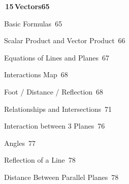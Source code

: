 \documentclass[a4paper,openany]{book}
\begin{document}
{\medskip\noindent\colorbox{blue!8}{\parbox{\dimexpr\textwidth-2\fboxsep}{\large\bfseries\color{blue!50!black}\colorbox{blue!50!black}{\color{white}\,15\,}\quad Vectors\hfill 65}}\par\nopagebreak\smallskip\nopagebreak
\noindent{}\quad Basic Formulas\dotfill\ 65\par
\noindent{}\quad Scalar Product and Vector Product\dotfill\ 66\par
\noindent{}\quad Equations of Lines and Planes\dotfill\ 67\par
\noindent{}\quad Interactions Map\dotfill\ 68\par
\noindent{}\quad Foot / Distance / Reflection\dotfill\ 68\par
\noindent{}\quad Relationships and Intersections\dotfill\ 71\par
\noindent{}\quad Interaction between 3 Planes\dotfill\ 76\par
\noindent{}\quad Angles\dotfill\ 77\par
\noindent{}\quad Reflection of a Line\dotfill\ 78\par
\noindent{}\quad Distance Between Parallel Planes\dotfill\ 78\par
}
\end{document}
